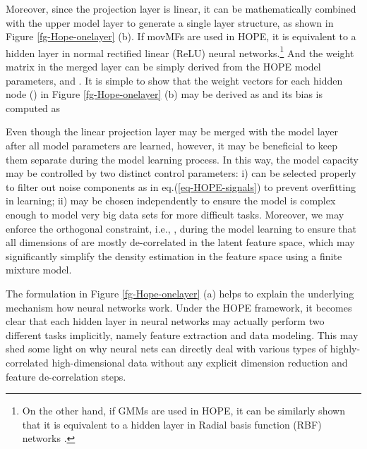 \documentclass[11pt]{article}
\begin{document}
Moreover, since the projection layer is linear, it can be mathematically combined with the upper model layer to generate a single layer structure, as shown in Figure \ref{fg-Hope-onelayer} (b).  If movMFs are used in HOPE, it is equivalent to a hidden layer in normal rectified linear (ReLU) neural networks.\footnote{On the other hand, if GMMs are used in HOPE, it can be similarly shown that it is equivalent to a hidden layer in Radial basis function (RBF) networks \cite{RBFNetwork1991}.}  And the weight matrix in the merged layer can be simply derived from the HOPE model parameters,  and . It is simple to show that the weight vectors for each hidden node  () in Figure \ref{fg-Hope-onelayer} (b) may be derived  as  
and its bias  is computed as 

Even though the linear projection layer may be merged with the model layer after all model parameters are learned, however, it may be beneficial to keep them separate during the model learning process. In this way, the model capacity may be controlled by two distinct control parameters: i)  can be selected properly to filter out noise components as in eq.(\ref{eq-HOPE-signals}) to prevent overfitting in learning; ii)  may be chosen independently to ensure the model is complex enough to model very big data sets for more difficult tasks. Moreover, we may enforce the orthogonal constraint, i.e., , during the model learning to ensure that all dimensions of  are mostly de-correlated in the latent feature space, which may significantly simplify the density estimation in the feature space using a finite mixture model. 

The formulation in Figure \ref{fg-Hope-onelayer} (a) helps to explain the underlying mechanism how neural networks work. Under the HOPE framework, it becomes clear that each hidden layer in neural networks may actually perform two different tasks implicitly, namely feature extraction and data modeling. This may shed some light on why neural nets can directly deal with various types of highly-correlated high-dimensional data \cite{Pan2012} without any explicit dimension reduction and feature de-correlation steps. 
\end{document}

